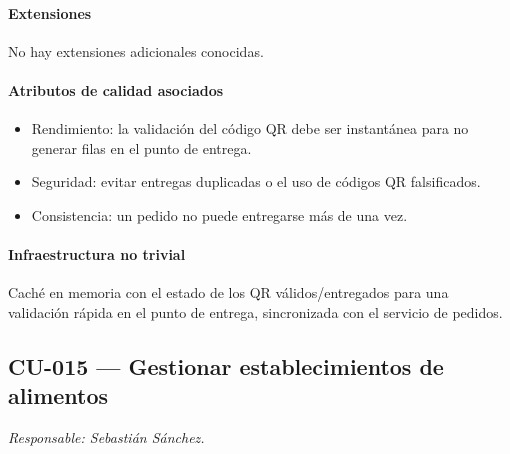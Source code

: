 \paragraph{Extensiones}
No hay extensiones adicionales conocidas.

\paragraph{Atributos de calidad asociados}
\begin{itemize}[leftmargin=1.4em, topsep=1pt]
  \item Rendimiento: la validación del código QR debe ser instantánea para no generar filas en el punto de entrega.
  \item Seguridad: evitar entregas duplicadas o el uso de códigos QR falsificados.
  \item Consistencia: un pedido no puede entregarse más de una vez.
\end{itemize}

\paragraph{Infraestructura no trivial}
Caché en memoria con el estado de los QR válidos/entregados para una validación rápida en el punto de entrega, sincronizada con el servicio de pedidos.

\subsection{CU-015 --- Gestionar establecimientos de alimentos}
\label{cu:cu-015}
\textit{Responsable: Sebastián Sánchez.}


